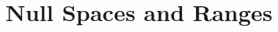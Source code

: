 \section{Null Spaces and Ranges}

\begin{exercise}
    \td \\
\end{exercise}

\begin{solution}
    \\ \td \\
\end{solution}
